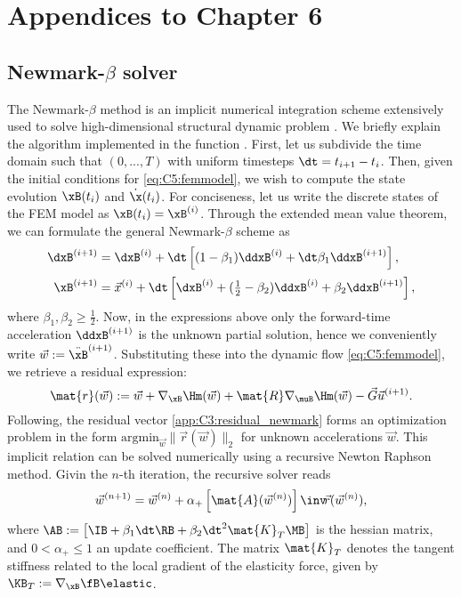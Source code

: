 \chapter{Appendices to Chapter 6}
\section{Newmark-$\beta$ solver}
\label{app:C5:newmark}
The Newmark-$\beta$ method is an implicit numerical integration scheme extensively used to solve high-dimensional structural dynamic problem \cite{Newmark1959Jul,Holzapfel2002}. We briefly explain the algorithm implemented in the function . First, let us subdivide the time domain such that $(0,...,T)$ with uniform timesteps $\dt = t_{i+1} - t_i$. Then, given the initial conditions for \eqref{eq:C5:femmodel}, we wish to compute the state evolution $\xB(t_i)$ and $\dot{\x}(t_i)$. For conciseness, let us write the discrete states of the FEM model as $\xB(t_i) = \xB^{(i)}$. Through the extended mean value theorem, we can formulate the general Newmark-$\beta$ scheme as
%
\begin{align}
    {\dxB}^{(i+1)} & = {\dxB}^{(i)} + \dt \left[(1-\beta_1)\ddxB^{(i)} + \dt \beta_1 \ddxB^{(i+1)} \right],                        \\[0.2em]
    {\xB}^{(i+1)}  & = {\vec{x}}^{(i)} + \dt\left[ \dxB^{(i)} + (\tfrac{1}{2}-\beta_2)\ddxB^{(i)} + \beta_2 \ddxB^{(i+1)} \right],
\end{align}
%
where $\beta_1,\beta_2 \ge \frac{1}{2}$. Now, in the expressions above only the forward-time acceleration $\ddxB^{(i+1)}$ is the unknown partial solution, hence we conveniently write $\vec{w} := \ddot{\xB}^{(i+1)}$. Substituting these into the dynamic flow \eqref{eq:C5:femmodel}, we retrieve a residual expression:
%
\begin{equation}
\mat{r}(\vec{w}): = \vec{w} +\nabla_{\xB}\Hm(\vec{w}) + \mat{R}\nabla_{\muB}\Hm(\vec{w}) -  \vec{G}\vec{u}^{(i+1)}.
\label{app:C3:residual_newmark}
\end{equation}
%
Following, the residual vector \eqref{app:C3:residual_newmark} forms an optimization problem in the form $\text{argmin}_{\vec{w}} \lVert \vec{r}(\vec{w}) \rVert_2$ for unknown accelerations $\vec{w}$. This implicit relation can be solved numerically using a recursive Newton Raphson method. Givin the $n$-th iteration, the recursive solver reads
%
\begin{equation}
    \vec{w}^{(n+1)} = \vec{w}^{(n)} + \alpha_+ \left[ \mat{A}(\vec{w}^{(n)}) \right]\inv\! \vec{r}(\vec{w}^{(n)}),
    \label{eq:C3:newmark_newtonsolver}
\end{equation}
%
where $\AB := \left[\IB + \beta_1 \dt \RB  + \beta_2 \dt^2 \mat{K}_{T}\MB\right]$ is the hessian matrix, and $0< \alpha_+ \le 1$ an update coefficient. The matrix $\mat{K}_T$ denotes the tangent stiffness related to the local gradient of the elasticity force, given by $\KB_T := \nabla_{\xB} \fB\elastic$.